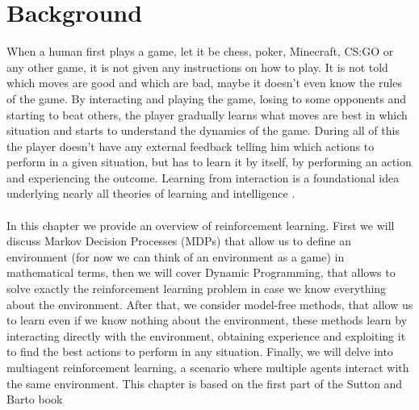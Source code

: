 \chapter{Background}
When a human first plays a game, let it be chess, poker, Minecraft, CS:GO or any other game, it is not given any instructions on how to play. It is not told which moves are good and which are bad, maybe it doesn't even know the rules of the game. By interacting and playing the game, losing to some opponents and starting to beat others, the player gradually learns what moves are best in which situation and starts to understand the dynamics of the game. During all of this the player doesn't have any external feedback telling him which actions to perform in a given situation, but has to learn it by itself, by performing an action and experiencing the outcome. Learning from interaction is a foundational idea underlying nearly all theories of learning and intelligence \cite{sutton-barto}.\\\\
In this chapter we provide an overview of reinforcement learning. First we will discuss Markov Decision Processes (MDPs) that allow us to define an environment (for now we can think of an environment as a game) in mathematical terms, then we will cover Dynamic Programming, that allows to solve exactly the reinforcement learning problem in case we know everything about the environment. After that, we consider model-free methods, that allow us to learn even if we know nothing about the environment, these methods learn by interacting directly with the environment, obtaining experience and exploiting it to find the best actions to perform in any situation. Finally, we will delve into multiagent reinforcement learning, a scenario where multiple agents interact with the same environment. This chapter is based on the first part of the Sutton and Barto book \cite{sutton-barto}

